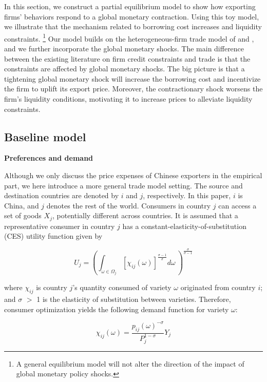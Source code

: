 In this section, we construct a partial equilibrium model to show how exporting firms' behaviors respond to a global monetary contraction. Using this toy model, we illustrate that the mechanism related to borrowing cost increases and liquidity constraints.  \footnote{A general equilibrium model will not alter the direction of the impact of global monetary policy shocks.} Our model builds on the heterogeneous-firm trade model of \cite{melitz2003impact} and \cite{manova2013credit}, and we further incorporate the global monetary shocks. The main difference between the existing literature on firm credit constraints and trade is that the constraints are affected by global monetary shocks. The big picture is that a tightening global monetary shock will increase the borrowing cost and incentivize the firm to uplift its export price. Moreover, the contractionary shock worsens the firm's liquidity conditions, motivating it to increase prices to alleviate liquidity constraints.

\subsection{Baseline model}

\textbf{Preferences and demand}

Although we only discuss the price expenses of Chinese exporters in the empirical part, we here introduce a more general trade model setting. The source and destination countries are denoted by $i$ and $j$, respectively. In this paper, $i$ is China, and $j$ denotes the rest of the world. Consumers in country $j$ can access a set of goods $X_j$, potentially different across countries. It is assumed that a representative consumer in country $j$ has a constant-elasticity-of-substitution (CES) utility function given by

\begin{equation}
U_j=(\int_{\omega \in \Omega_j} [\chi_{ij}(\omega)]^{\frac{\sigma-1}{\sigma}} d\omega\ )^\frac{\sigma}{\sigma-1}
\end{equation}

where $\chi_{ij}$ is country $j$’s quantity consumed of variety $\omega$ originated from country $i$; and $\sigma$ $>$ 1 is the elasticity of substitution between varieties. Therefore, consumer optimization yields the following demand function for variety $\omega$:

\begin{equation}
\chi_{ij}(\omega)=\frac{p_{ij}(\omega)^{-\sigma}}{P_j^{1-\sigma}} Y_j
\end{equation}


